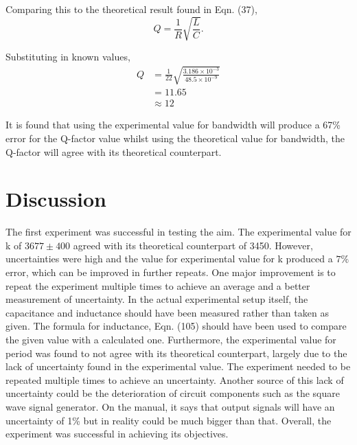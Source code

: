 \documentclass{article}
\begin{document}
Comparing this to the theoretical result found in Eqn. (37),
\begin{equation}
    Q = \frac{1}{R}\sqrt{\frac{L}{C}}.
\end{equation}

Substituting in known values,
\begin{equation}
    \begin{split}
        Q &= \frac{1}{22}\sqrt{\frac{3.186\times10^{-3}}{48.5\times10^{-9}}} \\
        &= 11.65 \\
        &\approx 12
    \end{split}
\end{equation}

It is found that using the experimental value for bandwidth will produce a 67\%
error for the Q-factor value whilst using the theoretical value for bandwidth, 
the Q-factor will agree with its theoretical counterpart.

\section{Discussion}
The first experiment was successful in testing the aim. The experimental value
for k of $3677 \pm 400$ agreed with its theoretical counterpart of 3450. However,
uncertainties were high and the value for experimental value for k produced a $7\%$
error, which can be improved in further repeats. One major improvement is to repeat
the experiment multiple times to achieve an average and a better measurement of 
uncertainty. In the actual experimental setup itself, the capacitance and inductance
should have been measured rather than taken as given. The formula for inductance, Eqn. 
(105) should have been used to compare the given value with a calculated one. 
Furthermore, the experimental value for period was found to not agree with its theoretical
counterpart, largely due to the lack of uncertainty found in the experimental value. The
experiment needed to be repeated multiple times to achieve an uncertainty. Another source
of this lack of uncertainty could be the deterioration of circuit components such as the 
square wave signal generator. On the manual, it says that output signals will have an
uncertainty of 1\% but in reality could be much bigger than that. Overall, the experiment
was successful in achieving its objectives.
\end{document}
